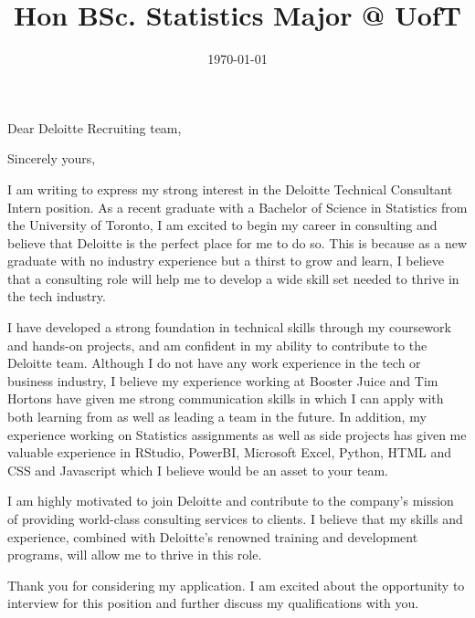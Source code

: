 \documentclass[11pt,a4paper,sans]{moderncv} %
\title{Hon BSc. Statistics Major @ UofT}
\begin{document}


\clearpage

\date{\today} %
\opening{Dear Deloitte Recruiting team,} %
\closing{Sincerely yours,} %

\makelettertitle %

I am writing to express my strong interest in the Deloitte Technical Consultant Intern position. As a recent graduate with a Bachelor of Science in Statistics from the University of Toronto, I am excited to begin my career in consulting and believe that Deloitte is the perfect place for me to do so. This is because as a new graduate with no industry experience but a thirst to grow and learn, I believe that a consulting role will help me to develop a wide skill set needed to thrive in the tech industry.

I have developed a strong foundation in technical skills through my coursework and hands-on projects, and am confident in my ability to contribute to the Deloitte team. Although I do not have any work experience in the tech or business industry, I believe my experience working at Booster Juice and Tim Hortons have given me strong communication skills in which I can apply with both learning from as well as leading a team in the future. In addition, my experience working on Statistics assignments as well as side projects has given me valuable experience in RStudio, PowerBI, Microsoft Excel, Python, HTML and CSS and Javascript which I believe would be an asset to your team.

I am highly motivated to join Deloitte and contribute to the company's mission of providing world-class consulting services to clients. I believe that my skills and experience, combined with Deloitte's renowned training and development programs, will allow me to thrive in this role.

Thank you for considering my application. I am excited about the opportunity to interview for this position and further discuss my qualifications with you.
\end{document}
